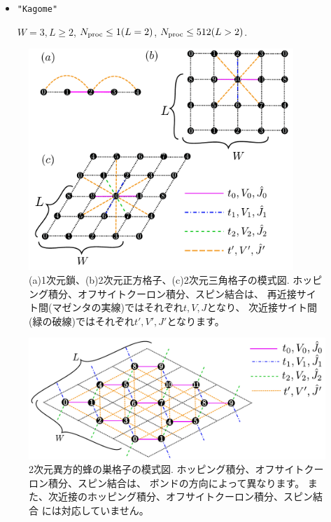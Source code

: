 \begin{itemize}
\begin{itemize}
  \item \verb|"Kagome"|

    $W=3, L \geq 2$, $N_{\rm proc} \leq 1(L=2)$, $N_{\rm proc} \leq 512(L>2)$.

\end{itemize}

\begin{figure}[!htbp]
  \begin{center}
    \includegraphics[width=10cm]{../figs/chap04_1_lattice.pdf}
    \caption{(a)1次元鎖、(b)2次元正方格子、(c)2次元三角格子の模式図. 
      ホッピング積分、オフサイトクーロン積分、スピン結合は、
      再近接サイト間(マゼンタの実線)ではそれぞれ$t,V,J$となり、
      次近接サイト間(緑の破線)ではそれぞれ$t',V',J'$となります。}
    \label{fig_chap04_1_lattice}
  \end{center}
\end{figure}

\begin{figure}[!htbp]
  \begin{center}
    \includegraphics[width=15cm]{../figs/chap04_1_honeycomb.pdf}
    \caption{2次元異方的蜂の巣格子の模式図. 
      ホッピング積分、オフサイトクーロン積分、スピン結合は、
      ボンドの方向によって異なります。
      また、次近接のホッピング積分、オフサイトクーロン積分、スピン結合
      には対応していません。
    }
    \label{fig_chap04_1_honeycomb}
  \end{center}
\end{figure}


\end{itemize}
